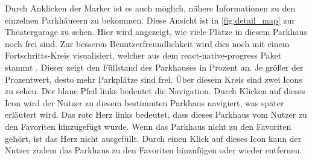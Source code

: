 Durch Anklicken der Marker ist es auch möglich, nähere Informationen zu den einzelnen Parkhäusern zu bekommen. Diese Ansicht ist in \autoref{fig:detail_map} zur Theatergarage zu sehen. Hier wird angezeigt, wie viele Plätze in diesem Parkhaus noch frei sind. Zur besseren Benutzerfreundlichkeit wird dies noch mit einem Fortschritts-Kreis visualisiert, welcher aus dem react-native-progress Paket stammt \cite{progress}. Dieser zeigt den Füllstand des Parkhauses in Prozent an. Je größer der Prozentwert, desto mehr Parkplätze sind frei. Über diesem Kreis sind zwei Icons zu sehen. Der blaue Pfeil links bedeutet die Navigation. Durch Klicken auf dieses Icon wird der Nutzer zu diesem bestimmten Parkhaus navigiert, was später erläutert wird. Das rote Herz links bedeutet, dass dieses Parkhaus vom Nutzer zu den Favoriten hinzugefügt wurde. Wenn das Parkhaus nicht zu den Favoriten gehört, ist das Herz nicht ausgefüllt. Durch einen Klick auf dieses Icon kann der Nutzer zudem das Parkhaus zu den Favoriten hinzufügen oder wieder entfernen.

